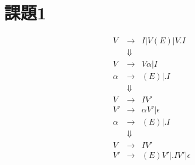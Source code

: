 \documentclass[a4paper,12pt]{jarticle}
\begin{document}
\section*{課題1}
\begin{comment}
左再帰をもつ構文規則、
\begin{displaymath}
V \rightarrow I | V \left( E \right) | V . I
\end{displaymath}
を、変換の過程を詳細に示しながら、右再帰の構文規則に変換せよ。
\end{comment}
\begin{eqnarray*}
V & \rightarrow &  I | V \left( E \right) | V . I \\
& \Downarrow & \\
V & \rightarrow &  V \alpha | I \\
\alpha & \rightarrow & \left( E \right) | . I \\
& \Downarrow & \\
V & \rightarrow & I V'\\
V' & \rightarrow & \alpha V' | \epsilon \\
\alpha & \rightarrow & \left( E \right) | . I \\
& \Downarrow & \\
V & \rightarrow & I V' \\
V' & \rightarrow & \left( E \right) V' | . I V' | \epsilon
\end{eqnarray*}
\end{document}
